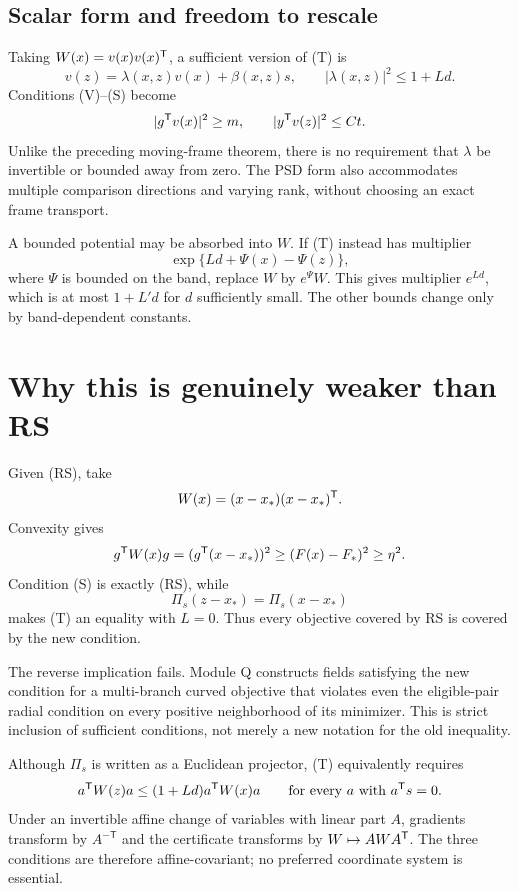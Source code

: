 \documentclass[10pt,oneside,openany]{book}
\theoremstyle{remark}\newtheorem{remark}{Remark}[chapter]
\begin{document}
\subsection{Scalar form and freedom to rescale}
Taking $W(x)=v(x)v(x)^{\mathsf T}$, a sufficient version of (T) is
\[
 v(z)=\lambda(x,z)v(x)+\beta(x,z)s,\qquad
 |\lambda(x,z)|^2\le1+L d.
\]
Conditions (V)--(S) become
\[
 |g^{\mathsf T} v(x)|^2\ge m,\qquad |y^{\mathsf T} v(z)|^2\le Ct.
\]
Unlike the preceding moving-frame theorem, there is no requirement that $\lambda$ be invertible or bounded away from zero. The PSD form also accommodates multiple comparison directions and varying rank, without choosing an exact frame transport.

A bounded potential may be absorbed into $W$. If (T) instead has multiplier
\[
 \exp\{L d+\Psi(x)-\Psi(z)\},
\]
where $\Psi$ is bounded on the band, replace $W$ by $e^{\Psi}W$. This gives multiplier $e^{Ld}$, which is at most $1+L'd$ for $d$ sufficiently small. The other bounds change only by band-dependent constants.


\setcounter{section}{3}
\setcounter{theorem}{1}
\setcounter{lemma}{0}
\setcounter{corollary}{0}
\setcounter{proposition}{0}
\setcounter{remark}{0}
\setcounter{equation}{6}
\section{Why this is genuinely weaker than RS}
Given (RS), take
\[
 W(x)=(x-x_*)(x-x_*)^{\mathsf T}.
\]
Convexity gives
\[
 g^{\mathsf T} W(x)g=(g^{\mathsf T}(x-x_*))^2\ge(F(x)-F_*)^2\ge\eta^2.
\]
Condition (S) is exactly (RS), while
\[
 \Pi_s(z-x_*)=\Pi_s(x-x_*)
\]
makes (T) an equality with $L=0$. Thus every objective covered by RS is covered by the new condition.

The reverse implication fails. Module Q constructs fields satisfying the new condition for a multi-branch curved objective that violates even the eligible-pair radial condition on every positive neighborhood of its minimizer. This is strict inclusion of sufficient conditions, not merely a new notation for the old inequality.

Although $\Pi_s$ is written as a Euclidean projector, (T) equivalently requires
\[
 a^{\mathsf T} W(z)a\le(1+Ld)a^{\mathsf T} W(x)a\qquad\text{for every }a\text{ with }a^{\mathsf T} s=0.
\]
Under an invertible affine change of variables with linear part $A$, gradients transform by $A^{-\mathsf T}$ and the certificate transforms by $W\mapsto AWA^{\mathsf T}$. The three conditions are therefore affine-covariant; no preferred coordinate system is essential.
\end{document}
